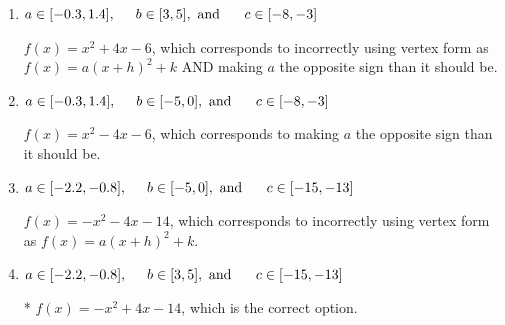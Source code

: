 \documentclass{extbook}[14pt]
\begin{document}
\begin{enumerate}
{\begin{enumerate}[label=\Alph*.]
$f(x)=-x^{2} -4 x + 6$, which corresponds to incorrectly using vertex form as $f(x) = a(x+h)^2 - k$.
\item \( a \in [-0.3, 1.4], \hspace*{5mm} b \in [3, 5], \text{ and } \hspace*{5mm} c \in [-8, -3] \)

$f(x)=x^{2} +4 x -6$, which corresponds to incorrectly using vertex form as $f(x) = a(x+h)^2+k$ AND making $a$ the opposite sign than it should be.
\item \( a \in [-0.3, 1.4], \hspace*{5mm} b \in [-5, 0], \text{ and } \hspace*{5mm} c \in [-8, -3] \)

$f(x)=x^{2} -4 x -6$, which corresponds to making $a$ the opposite sign than it should be.
\item \( a \in [-2.2, -0.8], \hspace*{5mm} b \in [-5, 0], \text{ and } \hspace*{5mm} c \in [-15, -13] \)

$f(x)=-x^{2} -4 x -14$, which corresponds to incorrectly using vertex form as $f(x) = a(x+h)^2+k$.
\item \( a \in [-2.2, -0.8], \hspace*{5mm} b \in [3, 5], \text{ and } \hspace*{5mm} c \in [-15, -13] \)

* $f(x)=-x^{2} +4 x -14$, which is the correct option.
\end{enumerate}

}
\end{enumerate}
\end{document}

